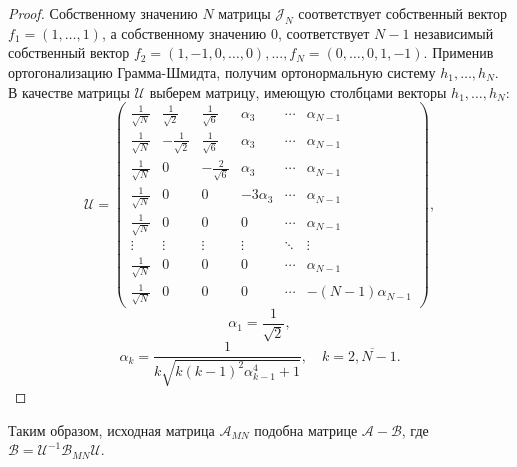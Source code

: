 \begin{proof}
    Собственному значению \( N \) матрицы \( \mathcal{J}_N \) 
    соответствует собственный вектор \( f_1 = {\left(1,\ldots,1\right)} \),
        а собственному значению \( 0 \), соответствует \( N-1 \) независимый собственный вектор
        \( f_2 = {\left(1,-1,0,\ldots,0\right)}, ...,
           f_N = {\left(0,\ldots,0,1,-1\right)} \).
    Применив ортогонализацию Грамма-Шмидта, получим ортонормальную систему \( h_1, \ldots, h_N \).
    В качестве матрицы \( \mathcal{U} \) выберем матрицу,
    имеющую столбцами векторы \( h_1, \ldots, h_N \):
    \[ \mathcal{U} =
    \begin{pmatrix}
        \frac{1}{\sqrt N} &  \frac{1}{\sqrt2} &  \frac{1}{\sqrt{6}} &   \alpha_3 & \cdots & \alpha_{N-1} \\
        \frac{1}{\sqrt N} & -\frac{1}{\sqrt2} &  \frac{1}{\sqrt{6}} &   \alpha_3 & \cdots & \alpha_{N-1} \\
        \frac{1}{\sqrt N} & 0                 & -\frac{2}{\sqrt{6}} &   \alpha_3 & \cdots & \alpha_{N-1} \\
        \frac{1}{\sqrt N} & 0                 &  0                  & -3\alpha_3 & \cdots & \alpha_{N-1} \\
        \frac{1}{\sqrt N} & 0                 &  0                  & 0          & \cdots & \alpha_{N-1} \\
        \vdots    & \vdots            &  \vdots             & \vdots     & \ddots & \vdots  \\
        \frac{1}{\sqrt N} & 0                 &  0                  & 0          & \cdots & \alpha_{N-1} \\
        \frac{1}{\sqrt N} & 0                 &  0                  & 0          & \cdots & -(N-1)\alpha_{N-1}
    \end{pmatrix},\]
    \[
        \alpha_1 = \frac{1}{\sqrt{2}}, \]
    \[
        \alpha_k = \frac{1}{k\sqrt{k(k-1)^2 \alpha_{k-1}^4 + 1}}, \quad k=\overline{2,N-1}.\]
\end{proof}

Таким образом, исходная матрица \( \mathcal{A}_{MN} \) подобна матрице
\( \mathcal{A} - \mathcal{B} \), где \( \mathcal{B} = \mathcal{U}^{-1} \mathscr{B}_{MN} \mathcal{U} \).
